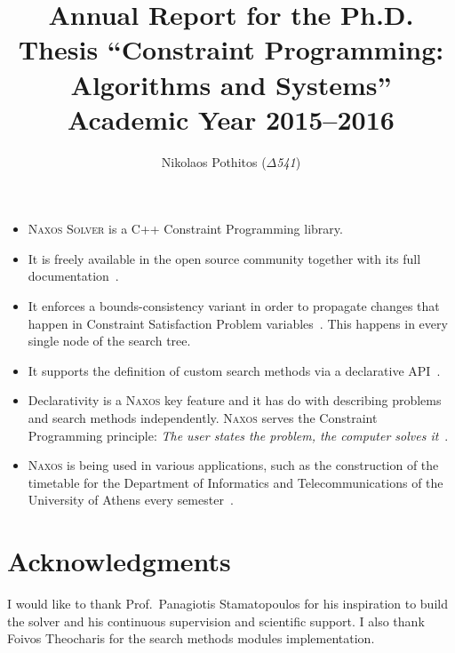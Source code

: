 \documentclass[a4paper]{article}
\begin{document}
\title{Annual Report for the Ph.D. Thesis ``Constraint Programming: Algorithms and Systems'' Academic Year 2015--2016}

\author{Nikolaos Pothitos ($\Delta$\emph{541})}


\date{}

\maketitle

\begin{itemize}
  \item \textsc{Naxos Solver} is a C++ Constraint
        Programming library.
  \item It is freely available in the open source community
        together with its full documentation~\cite{Naxos}.
  \item It enforces a bounds-consistency variant in order to
        propagate changes that happen in Constraint
        Satisfaction Problem variables~\cite{Bessiere2006}.
        This happens in every single node of the search
        tree.
  \item It supports the definition of custom search methods
        via a declarative API~\cite{Pothitos2017}.
  \item Declarativity is a \textsc{Naxos} key feature and it
        has do with describing problems and search methods
        independently. \textsc{Naxos} serves the Constraint
        Programming principle: \emph{The user states the
        problem, the computer solves it}~\cite{Freuder2014}.
  \item \textsc{Naxos} is being used in various
        applications, such as the construction of the
        timetable for the Department of Informatics and
        Telecommunications of the University of Athens every
        semester~\cite{Pothitos2012-Scheduling}.
\end{itemize}

\section*{Acknowledgments}

I would like to thank Prof.~Panagiotis Stamatopoulos for his
inspiration to build the solver and his continuous
supervision and scientific support. I also thank Foivos
Theocharis for the search methods modules implementation.



\end{document}
